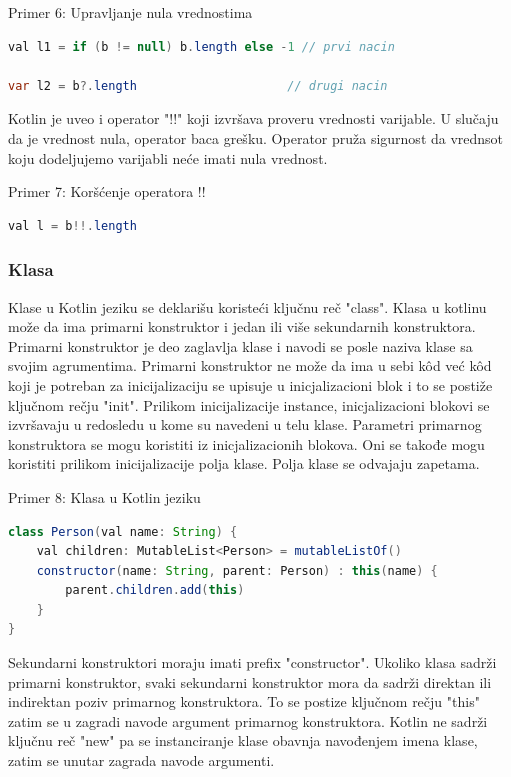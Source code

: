 \documentclass[12pt,oneside]{memoir}
\begin{document}
\begin{center} Primer 6: Upravljanje nula vrednostima\end{center}
\begin{lstlisting}[language=Java]
val l1 = if (b != null) b.length else -1 // prvi nacin
 
var l2 = b?.length                     // drugi nacin
\end{lstlisting}
 
Kotlin je uveo i operator "!!" koji izvršava proveru vrednosti varijable. U slučaju da je vrednost nula, operator baca grešku. Operator pruža sigurnost da vrednsot koju dodeljujemo varijabli neće imati nula vrednost.
 
\begin{center} Primer 7: Koršćenje operatora !!\end{center}
\begin{lstlisting}[language=Java]
val l = b!!.length
\end{lstlisting}
 
\subsubsection{Klasa}
Klase u Kotlin jeziku se deklarišu koristeći ključnu reč "class". Klasa u kotlinu može da ima primarni konstruktor i jedan ili više sekundarnih konstruktora. Primarni konstruktor je deo zaglavlja klase i navodi se posle naziva klase sa svojim agrumentima. Primarni konstruktor ne može da ima u sebi kôd već kôd koji je potreban za inicijalizaciju se upisuje u inicjalizacioni blok i to se postiže ključnom rečju "init". Prilikom inicijalizacije instance, inicjalizacioni blokovi se izvršavaju u redosledu u kome su navedeni u telu klase. Parametri primarnog konstruktora se mogu koristiti iz inicjalizacionih blokova. Oni se takođe mogu koristiti prilikom inicijalizacije polja klase. Polja klase se odvajaju zapetama. 
 
\begin{center} Primer 8: Klasa u Kotlin jeziku\end{center}
\begin{lstlisting}[language=Java]
class Person(val name: String) {
    val children: MutableList<Person> = mutableListOf()
    constructor(name: String, parent: Person) : this(name) {
        parent.children.add(this)
    }
}
\end{lstlisting}
 
Sekundarni konstruktori moraju imati prefix "constructor". Ukoliko klasa sadrži primarni konstruktor, svaki sekundarni konstruktor mora da sadrži direktan ili indirektan poziv primarnog konstruktora. To se postize ključnom rečju "this" zatim se u zagradi navode argument primarnog konstruktora. Kotlin ne sadrži ključnu reč "new" pa se instanciranje klase obavnja navođenjem imena klase, zatim se unutar zagrada navode argumenti.
 
\end{document}
